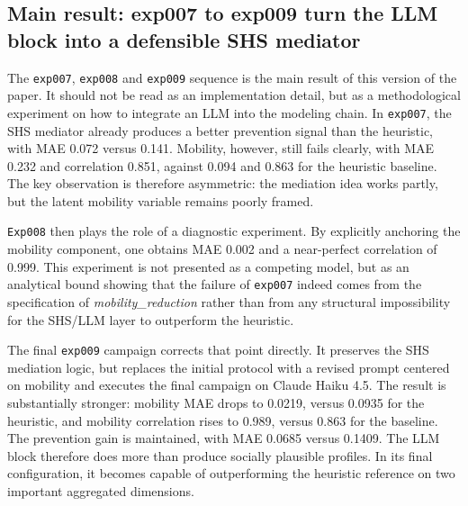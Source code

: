 \documentclass[ROIA,Unicode]{cedram}
\begin{document}
\subsection{Main result: exp007 to exp009 turn the LLM block into a defensible SHS mediator}
The \texttt{exp007}, \texttt{exp008} and \texttt{exp009} sequence is the main result of this version of the paper. It should not be read as an implementation detail, but as a methodological experiment on how to integrate an LLM into the modeling chain. In \texttt{exp007}, the SHS mediator already produces a better prevention signal than the heuristic, with MAE 0.072 versus 0.141. Mobility, however, still fails clearly, with MAE 0.232 and correlation 0.851, against 0.094 and 0.863 for the heuristic baseline. The key observation is therefore asymmetric: the mediation idea works partly, but the latent mobility variable remains poorly framed.

\texttt{Exp008} then plays the role of a diagnostic experiment. By explicitly anchoring the mobility component, one obtains MAE 0.002 and a near-perfect correlation of 0.999. This experiment is not presented as a competing model, but as an analytical bound showing that the failure of \texttt{exp007} indeed comes from the specification of \emph{mobility\_reduction} rather than from any structural impossibility for the SHS/LLM layer to outperform the heuristic.

The final \texttt{exp009} campaign corrects that point directly. It preserves the SHS mediation logic, but replaces the initial protocol with a revised prompt centered on mobility and executes the final campaign on Claude Haiku 4.5. The result is substantially stronger: mobility MAE drops to 0.0219, versus 0.0935 for the heuristic, and mobility correlation rises to 0.989, versus 0.863 for the baseline. The prevention gain is maintained, with MAE 0.0685 versus 0.1409. The LLM block therefore does more than produce socially plausible profiles. In its final configuration, it becomes capable of outperforming the heuristic reference on two important aggregated dimensions.

\begin{table}[ht]
    \centering
    \footnotesize
    \caption{Progression of the SHS/LLM block across recent campaigns. Exp008 primarily serves as a diagnostic on mobility anchoring and is therefore not directly comparable on prevention.}
    \label{tab:llm-progression}
\end{table}
\end{document}
